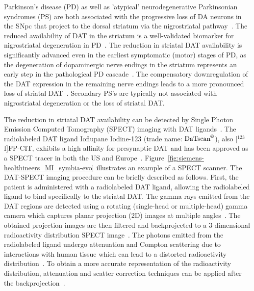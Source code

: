 Parkinson's disease (PD) as well as 'atypical' neurodegenerative Parkinsonian syndromes (PS) 
are both associated with the progressive loss of DA neurons in the SNpc 
that project to the dorsal striatum via the nigrostriatal pathway~\citep{Piggott1999}.
The reduced availability of DAT in the striatum is a well-validated biomarker 
for nigrostriatal degeneration in PD~\citep{Bernheimer1973, Fazio2018, Niznik1991}.
The reduction in striatal DAT availability is significantly advanced even in the earliest symptomatic (motor) stages of PD, 
as the degeneration of dopaminergic nerve endings in the striatum represents 
an early step in the pathological PD cascade~\citep{Bernheimer1973, Fazio2018, Niznik1991}.
The compensatory downregulation of the DAT expression in the remaining nerve endings 
leads to a more pronounced loss of striatal DAT~\citep{Lee2000, Saari2017, Honkanen2019}.
Secondary PS's are typically not associated with nigrostriatal degeneration or the loss of striatal DAT. 

The reduction in striatal DAT availability can be detected by Single Photon Emission Computed Tomography (SPECT) 
imaging with DAT ligands~\citep{Kuikka1995, Abi-Dargham1996}.
The radiolabeled DAT ligand Ioflupane Iodine-123 (trade name: $\text{DaTscan}^{\copyright}$), also [$^{123}$I]FP-CIT, 
exhibits a high affinity for presynaptic DAT and 
has been approved as a SPECT tracer in both the US and Europe~\citep{Neumeyer1994}.
Figure~\ref{fig:siemens-healthineers_MI_symbia-evo} illustrates an example of a SPECT scanner.
The DAT-SPECT imaging procedure can be briefly described as follows.
First, the patient is administered with a radiolabeled DAT ligand,
allowing the radiolabeled ligand to bind specifically to the striatal DAT.
The gamma rays emitted from the DAT regions are detected using a rotating (single-head or multiple-head) gamma camera
which captures planar projection (2D) images at multiple angles~\citep{Patton2008-xl}.
The obtained projection images are then filtered and 
backprojected to a 3-dimensional radioactivity distribution SPECT image~\citep{Patton2008-xl}.
The photons emitted from the radiolabeled ligand undergo attenuation and Compton scattering
due to interactions with human tissue which can lead to a distorted radioactivity distribution~\citep{Patton2008-xl}.
To obtain a more accurate representation of the radioactivity distribution, 
attenuation and scatter correction techniques can be applied after the backprojection~\citep{Patton2008-xl}.

